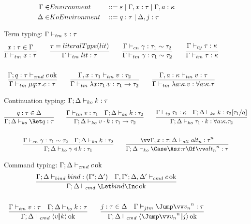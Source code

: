 \documentclass{article}
\begin{document}
\begin{figure}
\centering
\begin{align*}
  \Gamma \in& Environment
  &
  &::= \varepsilon
  \mid \Gamma, x : \tau
  \mid \Gamma, a : \kappa
  \\
  \Delta \in& KoEnvironment
  &
  &::= q : \tau
  \mid \Delta, j : \tau
\end{align*}

Term typing: $\Gamma \vdash_{tm} v : \tau$
\begin{gather*}
  \infer
  {\typetm{\Gamma}{x}{\ty}}
  {x:\ty \in \Gamma}
  \qquad
  \infer
  {\typetm{\Gamma}{\lit}{\ty}}
  {\ty = literalType(\lit)}
  \qquad
  \infer
  {\typetm{\Gamma}{\cn}{\eqty{\ty_1}{\ty_2}}}
  {\typecn{\Gamma}{\cn}{\eqty{\ty_1}{\ty_2}}}
  \qquad
  \infer
  {\typetm{\Gamma}{\ty}{\ki}}
  {\typety{\Gamma}{\ty}{\ki}}
  \\\\
  \infer
  {\typetm{\Gamma}{\compute{\ann q \ty} \cmd}{\ty}}
  {\typecmd{\Gamma}{q:\ty}{\cmd}}
  \qquad
  \infer
  {\typetm{\Gamma}{\fn{\ann x {\ty_1}} \tm}{\ty_1 \to \ty_2}}
  {\typetm{\Gamma, x:\ty_1}{\tm}{\ty_2}}
  \qquad
  \infer
  {\typetm{\Gamma}{\fn{\ann a \ki} \tm}{\forall \ann a \ki. \ty}}
  {\typetm{\Gamma, a:\ki}{\tm}{\ty}}
\end{gather*}

Continuation typing: $\Gamma; \Delta \vdash_{ko} k : \tau$
\begin{gather*}
  \infer
  {\typeko{\Gamma}{\Delta}{\ret q}{\ty}}
  {q:\ty \in \Delta}
  \qquad
  \infer
  {\typeko{\Gamma}{\Delta}{\app{\tm}{\ko}}{\ty_1 \to \ty_2}}
  {
    \typetm{\Gamma}{\tm}{\ty_1}
    &
    \typeko{\Gamma}{\Delta}{\ko}{\ty_2}
  }
  \qquad
  \infer
  {\typeko{\Gamma}{\Delta}{\app{\ty_1}{\ko}}{\forall \ann a \ki. \ty_2}}
  {
    \typety{\Gamma}{\ty_1}{\ki}
    &
    \typeko{\Gamma}{\Delta}{\ko}{\ty_2\subst{a}{\ty_1}}
  }
  \\\\
  \infer
  {\typeko{\Gamma}{\Delta}{\koerce{\cn}{\ko}}{\ty_1}}
  {
    \typecn{\Gamma}{\cn}{\eqty{\ty_1}{\ty_2}}
    &
    \typeko{\Gamma}{\Delta}{\ko}{\ty_2}
  }
  \qquad
  \infer
  {\typeko{\Gamma}{\Delta}{\caseas{\ann x \ty}{\vect[n]{\analt_n}}}{\ty}}
  {
    \vect[n]{
      \typealt{\Gamma, x:\ty}{\Delta}{\analt_n}{\ty}
    }
  }
\end{gather*}

Command typing: $\Gamma; \Delta \vdash_{cmd} c \operatorname{ok}$
\begin{gather*}
  \infer
  {\typecmd{\Gamma}{\Delta}{\Let \abind \In \cmd}}
  {
    \typebind{\Gamma}{\Delta}{\abind}{\Gamma'}{\Delta'}
    &
    \typecmd{\Gamma,\Gamma'}{\Delta,\Delta'}{\cmd}
  }
  \\\\
  \infer
  {\typecmd{\Gamma}{\Delta}{\cut{\tm}{\ko}}}
  {
    \typetm{\Gamma}{\tm}{\ty}
    &
    \typeko{\Gamma}{\Delta}{\ko}{\ty}
  }
  \qquad
  \infer
  {\typecmd{\Gamma}{\Delta}{\jump{\vect[n]{\tm_n}}{j}}}
  {
    j:\ty \in \Delta
    &
    \typejmptm{\Gamma}{\vect[n]{\tm_n}}{\ty}
  }
\end{gather*}


\end{figure}
\end{document}
